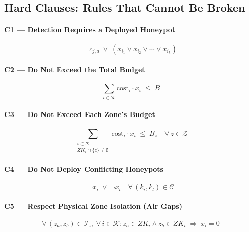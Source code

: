 \documentclass[journal]{IEEEtran}
\newcommand{\calK}{\mathcal{K}}
\newcommand{\calZ}{\mathcal{Z}}
\newcommand{\calC}{\mathcal{C}}
\begin{document}
\subsection{Hard Clauses: Rules That Cannot Be Broken}

\paragraph{C1 --- Detection Requires a Deployed Honeypot}
\begin{equation}
  \neg c_{j,a} \;\vee\;
  (x_{i_1} \vee x_{i_2} \vee \cdots \vee x_{i_k})
\end{equation}

\paragraph{C2 --- Do Not Exceed the Total Budget}
\begin{equation}
  \sum_{i \in \calK} \mathrm{cost}_i \cdot x_i \;\leq\; B
\end{equation}

\paragraph{C3 --- Do Not Exceed Each Zone's Budget}
\begin{equation}
  \sum_{\substack{i \in \calK \\ ZK_i \cap \{z\} \neq \emptyset}}
  \mathrm{cost}_i \cdot x_i \;\leq\; B_z
  \quad \forall\, z \in \calZ
\end{equation}

\paragraph{C4 --- Do Not Deploy Conflicting Honeypots}
\begin{equation}
  \neg x_i \;\vee\; \neg x_l
  \quad \forall\,(k_i,k_l) \in \calC
\end{equation}

\paragraph{C5 --- Respect Physical Zone Isolation (Air Gaps)}
\begin{equation}
  \forall\,(z_a,z_b) \in \mathcal{I}_z,\;
  \forall\, i \in \calK :
  z_a \in ZK_i \wedge z_b \in ZK_i
  \;\Longrightarrow\; x_i = 0
\end{equation}
\end{document}
